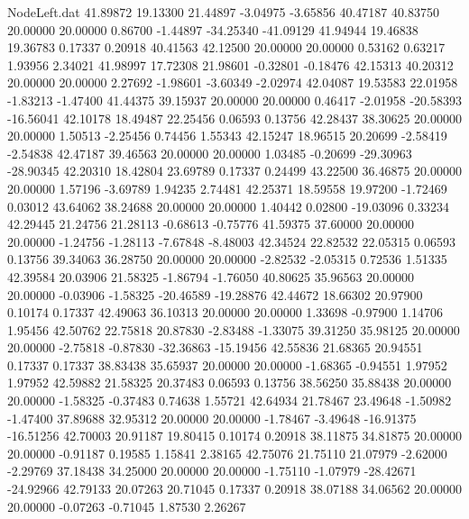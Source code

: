 \begin{filecontents}{NodeLeft.dat}
  41.89872   19.13300   21.44897    -3.04975   -3.65856   40.47187   40.83750   20.00000   20.00000    0.86700   -1.44897  -34.25340  -41.09129
  41.94944   19.46838   19.36783     0.17337    0.20918   40.41563   42.12500   20.00000   20.00000    0.53162    0.63217    1.93956    2.34021
  41.98997   17.72308   21.98601    -0.32801   -0.18476   42.15313   40.20312   20.00000   20.00000    2.27692   -1.98601   -3.60349   -2.02974
  42.04087   19.53583   22.01958    -1.83213   -1.47400   41.44375   39.15937   20.00000   20.00000    0.46417   -2.01958  -20.58393  -16.56041
  42.10178   18.49487   22.25456     0.06593    0.13756   42.28437   38.30625   20.00000   20.00000    1.50513   -2.25456    0.74456    1.55343
  42.15247   18.96515   20.20699    -2.58419   -2.54838   42.47187   39.46563   20.00000   20.00000    1.03485   -0.20699  -29.30963  -28.90345
  42.20310   18.42804   23.69789     0.17337    0.24499   43.22500   36.46875   20.00000   20.00000    1.57196   -3.69789    1.94235    2.74481
  42.25371   18.59558   19.97200    -1.72469    0.03012   43.64062   38.24688   20.00000   20.00000    1.40442    0.02800  -19.03096    0.33234
  42.29445   21.24756   21.28113    -0.68613   -0.75776   41.59375   37.60000   20.00000   20.00000   -1.24756   -1.28113   -7.67848   -8.48003
  42.34524   22.82532   22.05315     0.06593    0.13756   39.34063   36.28750   20.00000   20.00000   -2.82532   -2.05315    0.72536    1.51335
  42.39584   20.03906   21.58325    -1.86794   -1.76050   40.80625   35.96563   20.00000   20.00000   -0.03906   -1.58325  -20.46589  -19.28876
  42.44672   18.66302   20.97900     0.10174    0.17337   42.49063   36.10313   20.00000   20.00000    1.33698   -0.97900    1.14706    1.95456
  42.50762   22.75818   20.87830    -2.83488   -1.33075   39.31250   35.98125   20.00000   20.00000   -2.75818   -0.87830  -32.36863  -15.19456
  42.55836   21.68365   20.94551     0.17337    0.17337   38.83438   35.65937   20.00000   20.00000   -1.68365   -0.94551    1.97952    1.97952
  42.59882   21.58325   20.37483     0.06593    0.13756   38.56250   35.88438   20.00000   20.00000   -1.58325   -0.37483    0.74638    1.55721
  42.64934   21.78467   23.49648    -1.50982   -1.47400   37.89688   32.95312   20.00000   20.00000   -1.78467   -3.49648  -16.91375  -16.51256
  42.70003   20.91187   19.80415     0.10174    0.20918   38.11875   34.81875   20.00000   20.00000   -0.91187    0.19585    1.15841    2.38165
  42.75076   21.75110   21.07979    -2.62000   -2.29769   37.18438   34.25000   20.00000   20.00000   -1.75110   -1.07979  -28.42671  -24.92966
  42.79133   20.07263   20.71045     0.17337    0.20918   38.07188   34.06562   20.00000   20.00000   -0.07263   -0.71045    1.87530    2.26267

\end{filecontents}
